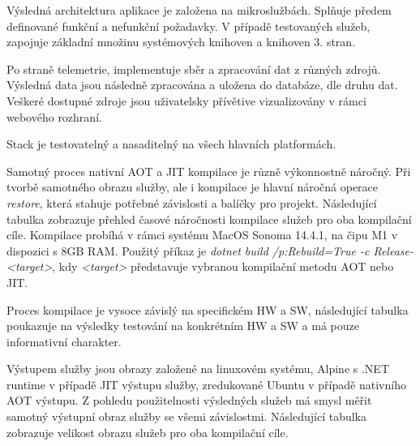 

Výsledná architektura aplikace je založena na mikroslužbách. Splňuje předem definované funkční a nefunkční požadavky. V případě testovaných služeb, zapojuje základní množinu systémových knihoven a knihoven 3. stran.

Po straně telemetrie, implementuje sběr a zpracování dat z různých zdrojů. Výsledná data jsou následně zpracována a uložena do databáze, dle druhu dat. Veškeré dostupné zdroje jsou uživatelsky přívětive vizualizovány v rámci webového rozhraní.

Stack je testovatelný a nasaditelný na všech hlavních platformách.



Samotný proces nativní AOT a JIT kompilace je různě výkonnostně náročný. Při tvorbě samotného obrazu služby, ale i kompilace je hlavní náročná operace \emph{restore}, která stahuje potřebné závislosti a balíčky pro projekt. Následující tabulka zobrazuje přehled časové náročnosti kompilace služeb pro oba kompilační cíle. Kompilace probíhá v rámci systému MacOS Sonoma 14.4.1, na čipu M1 v dispozici s 8GB RAM. Použitý příkaz je \emph{dotnet build /p:Rebuild=True -c Release-<target>}, kdy \emph{<target>} představuje vybranou kompilační metodu AOT nebo JIT.

Proces kompilace je vysoce závislý na specifickém HW a SW, následující tabulka poukazuje na výsledky testování na konkrétním HW a SW a má pouze informativní charakter.


Výstupem služby jsou obrazy založené na linuxovém systému, Alpine s .NET runtime v případě JIT výstupu služby, zredukované Ubuntu v případě nativního AOT výstupu. Z pohledu použitelnosti výsledných služeb má smysl měřit samotný výstupní obraz služby se všemi závislostmi. Následující tabulka zobrazuje velikost obrazu služeb pro oba kompilační cíle.

